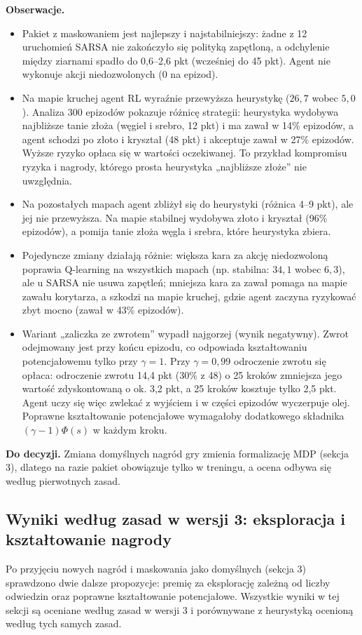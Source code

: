 \documentclass[11pt,a4paper]{article}
\begin{document}
\textbf{Obserwacje.}
\begin{itemize}
  \item Pakiet z maskowaniem jest najlepszy i najstabilniejszy: żadne z 12
  uruchomień SARSA nie zakończyło się polityką zapętloną, a odchylenie między
  ziarnami spadło do 0,6--2,6 pkt (wcześniej do 45 pkt). Agent nie wykonuje akcji
  niedozwolonych (0 na epizod).
  \item Na mapie kruchej agent RL wyraźnie przewyższa heurystykę ($26{,}7$ wobec
  $5{,}0$). Analiza 300 epizodów pokazuje różnicę strategii: heurystyka wydobywa
  najbliższe tanie złoża (węgiel i srebro, 12 pkt) i ma zawał w 14\% epizodów,
  a agent schodzi po złoto i kryształ (48 pkt) i akceptuje zawał w 27\% epizodów.
  Wyższe ryzyko opłaca się w wartości oczekiwanej. To przykład kompromisu ryzyka
  i nagrody, którego prosta heurystyka „najbliższe złoże” nie uwzględnia.
  \item Na pozostałych mapach agent zbliżył się do heurystyki (różnica 4--9 pkt),
  ale jej nie przewyższa. Na mapie stabilnej wydobywa złoto i kryształ (96\%
  epizodów), a pomija tanie złoża węgla i srebra, które heurystyka zbiera.
  \item Pojedyncze zmiany działają różnie: większa kara za akcję niedozwoloną
  poprawia Q-learning na wszystkich mapach (np. stabilna: $34{,}1$ wobec $6{,}3$),
  ale u SARSA nie usuwa zapętleń; mniejsza kara za zawał pomaga na mapie zawału
  korytarza, a szkodzi na mapie kruchej, gdzie agent zaczyna ryzykować zbyt
  mocno (zawał w 43\% epizodów).
  \item Wariant „zaliczka ze zwrotem” wypadł najgorzej (wynik negatywny). Zwrot
  odejmowany jest przy końcu epizodu, co odpowiada kształtowaniu potencjałowemu
  tylko przy $\gamma=1$. Przy $\gamma=0{,}99$ odroczenie zwrotu się opłaca:
  odroczenie zwrotu 14,4 pkt (30\% z 48) o 25 kroków zmniejsza jego wartość
  zdyskontowaną o ok. 3,2 pkt, a 25 kroków kosztuje tylko 2,5 pkt. Agent uczy się
  więc zwlekać z wyjściem i w części epizodów wyczerpuje olej. Poprawne
  kształtowanie potencjałowe wymagałoby dodatkowego składnika $(\gamma-1)\Phi(s)$
  w każdym kroku.
\end{itemize}

\textbf{Do decyzji.} Zmiana domyślnych nagród gry zmienia formalizację MDP
(sekcja 3), dlatego na razie pakiet obowiązuje tylko w treningu, a ocena odbywa
się według pierwotnych zasad.

\subsection{Wyniki według zasad w wersji 3: eksploracja i kształtowanie nagrody}\label{sec:e3}
Po przyjęciu nowych nagród i maskowania jako domyślnych (sekcja 3) sprawdzono dwie
dalsze propozycje: premię za eksplorację zależną od liczby odwiedzin oraz poprawne
kształtowanie potencjałowe. Wszystkie wyniki w tej sekcji są oceniane według zasad
w wersji 3 i porównywane z heurystyką ocenioną według tych samych zasad.
\end{document}
